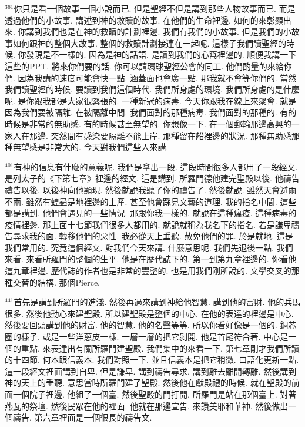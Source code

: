 \documentclass{book}
\begin{document}
$^{361}$你只是看一個故事一個小說而已.
但是聖經不但是講到那些人物故事而已.
而是透過他們的小故事.
講述到神的救贖的故事.
在他們的生命裡邊.
如何的來彰顯出來.
你講到我們也是在神的救贖的計劃裡邊.
我們有我們的小故事.
但是我們的小故事如何跟神的整個大故事.
整個的救贖計劃接連在一起呢.
這樣子我們讀聖經的時候.
你發現是不一樣的.
因為是神的話語.
是讀到我們的心窩裡邊的.
順便我講一下這些的PPT.
將來你們要的話.
你可以請環球聖經公會的同工.
他們酌量的來給你們.
因為我講的速度可能會快一點.
涵蓋面也會廣一點.
那我就不會等你們的.
當然我們讀聖經的時候.
要讀到我們這個時代.
我們所身處的環境.
我們所身處的是什麼呢.
是你跟我都是大家很緊張的.
一種新冠的病毒.
今天你跟我在線上來聚會.
就是因為我們要被隔離.
在被隔離中間.
我們面對的那種病毒.
我們面對的那種的.
有的時候是非常的無助感.
有的時候甚至無望的.
你想像一下.
在一個郵輪那邊高興的一家人在那邊.
突然間有感染要隔離不能上岸.
那種留在船裡邊的狀況.
那種無助感那種無望感是非常大的.
今天對我們這些人來講.

$^{401}$有神的信息有什麼的意義呢.
我們是拿出一段.
這段時間很多人都用了一段經文.
是列太子的《下第七章》裡邊的經文.
這是講到.
所羅門德他建完聖殿以後.
他禱告禱告以後.
以後神向他顯現.
然後就說我聽了你的禱告了.
然後就說.
雖然天會避雨不雨.
雖然有蝗蟲是地裡邊的土產.
甚至他會踩見文藝的道理.
我的指名中間.
這些都是講到.
他們會遇見的一些情況.
那跟你我一樣的.
就說在這種瘟疫.
這種病毒的疫情裡邊.
那上面十七節我們很多人都用的.
就說就稱為我名下的指名.
若是謙卑禱告尋求我的面.
轉移他們的惡性.
我必從天上垂聽.
赦免他們的罪.
於是就地.
這是我們常用的.
究竟這個經文.
對我們今天來講.
什麼意思呢.
我們先退後一點.
我們來看.
來看所羅門的整個的生平.
他是在歷代誌下的.
第一到第九章裡邊的.
你看他這九章裡邊.
歷代誌的作者也是非常的豐整的.
也是用我們剛所說的.
文學交叉的那種交替的結構.
那個Pierce.

$^{441}$首先是講到所羅門的進淺.
然後再過來講到神給他智慧.
講到他的富財.
他的兵馬很多.
然後他動心來建聖殿.
所以建聖殿是整個的中心.
在他的表達的裡邊是中心.
然後要回頭講到他的財富.
他的智慧.
他的名聲等等.
所以你看好像是一個的.
銅芯圈的樣子.
或是一些洋蔥皮一樣.
一層一層的把它剝開.
他是首尾符合著.
中心是一個的重點.
來表達出有關所羅門建聖殿.
我們集中的來看一下.
第七章剛才我們所讀的十四節.
何本跟信義本.
我們對照一下.
並且信義本是把它稍微.
口語化更新一點.
這一段經文裡面講到自卑.
但是謙卑.
講到禱告尋求.
講到離去離開轉離.
然後講到神的天上的垂聽.
意思當時所羅門建了聖殿.
然後他在獻殿禮的時候.
就在聖殿的前面一個院子裡邊.
他組了一個臺.
然後聖殿的門打開.
所羅門是站在那個臺上.
對著燕瓦的祭壇.
然後民眾在他的裡面.
他就在那邊宣告.
來讚美耶和華神.
然後做出一個禱告.
第六章裡面是一個很長的禱告文.
\end{document}
